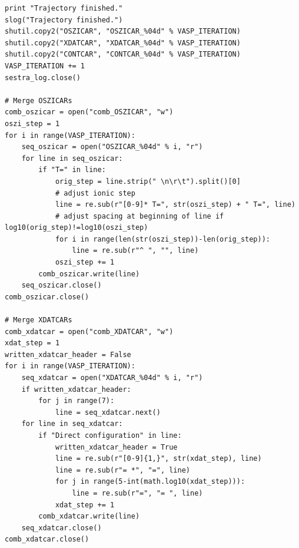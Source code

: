 \documentclass[twoside, 11pt, titlepage, captions=nooneline, a4paper, headsepline]{scrbook}%
\newcommand{\9}{\mathrm}
\newcommand{\0}{\,\mathrm}
\begin{document}
\begin{lstlisting}
print "Trajectory finished."
slog("Trajectory finished.")
shutil.copy2("OSZICAR", "OSZICAR_%04d" % VASP_ITERATION)
shutil.copy2("XDATCAR", "XDATCAR_%04d" % VASP_ITERATION)
shutil.copy2("CONTCAR", "CONTCAR_%04d" % VASP_ITERATION)
VASP_ITERATION += 1
sestra_log.close()

# Merge OSZICARs
comb_oszicar = open("comb_OSZICAR", "w")
oszi_step = 1
for i in range(VASP_ITERATION):
    seq_oszicar = open("OSZICAR_%04d" % i, "r")
    for line in seq_oszicar:
        if "T=" in line:
            orig_step = line.strip(" \n\r\t").split()[0]
            # adjust ionic step
            line = re.sub(r"[0-9]* T=", str(oszi_step) + " T=", line)        
            # adjust spacing at beginning of line if log10(orig_step)!=log10(oszi_step)
            for i in range(len(str(oszi_step))-len(orig_step)):
                line = re.sub(r"^ ", "", line)   
            oszi_step += 1
        comb_oszicar.write(line)
    seq_oszicar.close()
comb_oszicar.close()

# Merge XDATCARs
comb_xdatcar = open("comb_XDATCAR", "w")
xdat_step = 1
written_xdatcar_header = False
for i in range(VASP_ITERATION):
    seq_xdatcar = open("XDATCAR_%04d" % i, "r")
    if written_xdatcar_header:
        for j in range(7):
            line = seq_xdatcar.next()
    for line in seq_xdatcar:
        if "Direct configuration" in line:
            written_xdatcar_header = True
            line = re.sub(r"[0-9]{1,}", str(xdat_step), line)
            line = re.sub(r"= *", "=", line)
            for j in range(5-int(math.log10(xdat_step))):
                line = re.sub(r"=", "= ", line)
            xdat_step += 1
        comb_xdatcar.write(line)
    seq_xdatcar.close()
comb_xdatcar.close()   
\end{lstlisting}



\printindex
\end{document}
